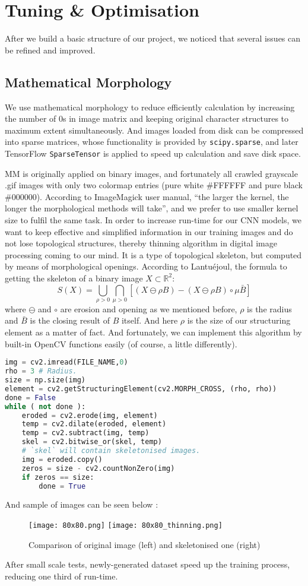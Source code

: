 \chapter{Tuning \& Optimisation}
After we build a basic structure of our project, we noticed that several issues can be refined and improved.

\section{Mathematical Morphology}\label{sec:MM}
We use mathematical morphology to reduce efficiently calculation by increasing the number of 0s in image matrix and keeping original character structures to maximum extent simultaneously. And images loaded from disk can be compressed into sparse matrices, whose functionality is provided by \texttt{scipy.sparse}, and later TensorFlow \texttt{SparseTensor} is applied to speed up calculation and save disk space.

MM is originally applied on binary images, and fortunately all crawled grayscale .gif images with only two colormap entries (pure white \#FFFFFF and pure black \#000000). According to ImageMagick user manual, ``the larger the kernel, the longer the morphological methods will take'', and we prefer to use smaller kernel size to fulfil the same task. In order to increase run-time for our CNN models, we want to keep effective and simplified information in our training images and do not lose topological structures, thereby thinning algorithm in digital image processing coming to our mind. It is a type of topological skeleton, but computed by means of morphological openings. According to Lantu\'{e}joul\cite{serra1983image}, the formula to getting the skeleton of a binary image $ X \subset \mathbb{R}^2 $:
\[ S(X) = \displaystyle \bigcup_{\rho > 0}\bigcap_{\mu > 0}[(X\ominus \rho B)-(X\ominus \rho B)\circ\mu\bar{B}] \]
where $ \ominus $ and $ \circ $ are erosion and opening as we mentioned before, $ \rho $ is the radius and $ \bar{B} $ is the closing result of $ B $ itself. And here $ \rho $ is the size of our structuring element as a matter of fact. And fortunately, we can implement this algorithm by built-in OpenCV functions easily (of course, a little differently).
\begin{lstlisting}[language = Python, caption = Skeletonisation]
img = cv2.imread(FILE_NAME,0)
rho = 3 # Radius.
size = np.size(img)
element = cv2.getStructuringElement(cv2.MORPH_CROSS, (rho, rho))
done = False
while ( not done ):
	eroded = cv2.erode(img, element)
	temp = cv2.dilate(eroded, element)
	temp = cv2.subtract(img, temp)
	skel = cv2.bitwise_or(skel, temp)
	# `skel` will contain skeletonised images.
	img = eroded.copy()
	zeros = size - cv2.countNonZero(img)
	if zeros == size:
		done = True
\end{lstlisting}
And sample of images can be seen below :
\begin{figure}[h]
	\centering
	\texttt{[image: 80x80.png]}
	\texttt{[image: 80x80\_thinning.png]} 
	\caption{ Comparison of original image (left) and skeletonised one (right)}
\end{figure}
After small scale tests, newly-generated dataset speed up the training process, reducing one third of run-time.

